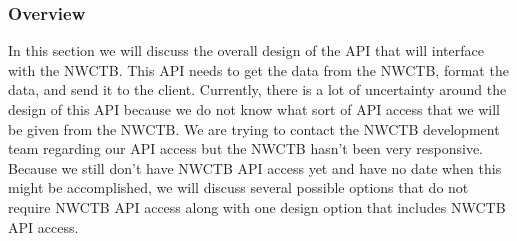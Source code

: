 \documentclass[onecolumn, draftclsnofoot,10pt, compsoc]{article}
\begin{document}
		\subsubsection{Overview}
			In this section we will discuss the overall design of the API that will interface with the NWCTB. This API needs to get the data from the NWCTB, format the data, and send it to the client. Currently, there is a lot of uncertainty around the design of this API because we do not know what sort of API access that we will be given from the NWCTB. We are trying to contact the NWCTB development team regarding our API access but the NWCTB hasn't been very responsive. Because we still don't have NWCTB API access yet and have no date when this might be accomplished, we will discuss several possible options that do not require NWCTB API access along with one design option that includes NWCTB API access.\\
\end{document}
